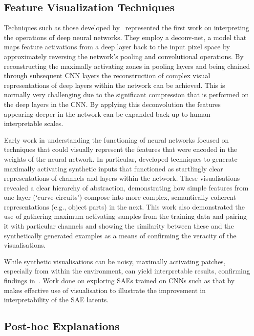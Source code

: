 \subsection{Feature Visualization Techniques}\label{subsec:visualising_neural_networks}

Techniques such as those developed by~\citet{zeiler_2013_visualizing} represented the first work on interpreting the operations of deep neural networks. They employ a deconv-net, a model that maps feature activations from a deep layer back to the input pixel space by approximately reversing the network's pooling and convolutional operations. By reconstructing the maximally activating zones in pooling layers and being chained through subsequent CNN layers the reconstruction of complex visual representations of deep layers within the network can be achieved. This is normally very challenging due to the significant compression that is performed on the deep layers in the CNN. By applying this deconvolution the features appearing deeper in the network can be expanded back up to human interpretable scales.

Early work in understanding the functioning of neural networks focused on techniques that could visually represent the features that were encoded in the weights of the neural network. In particular, \citet{olah_feature_2017} developed techniques to generate maximally activating synthetic inputs that functioned as startlingly clear representations of channels and layers within the network. These visualisations revealed a clear hierarchy of abstraction, demonstrating how simple features from one layer (`curve-circuits') compose into more complex, semantically coherent representations (e.g., object parts) in the next. This work also demonstrated the use of gathering maximum activating samples from the training data and pairing it with particular channels and showing the similarity between these and the synthetically generated examples as a means of confirming the veracity of the visualisations.



While synthetic visualisations can be noisy, maximally activating patches, especially from within the environment, can yield interpretable results, confirming findings in~\citet{hilton_2020_understanding}. Work done on exploring SAEs trained on CNNs such as that by~\citet{gorton_2024_missing} makes effective use of visualisation to illustrate the improvement in interpretability of the SAE latents.


\subsection{Post-hoc Explanations}\label{subsec:post_hoc}

